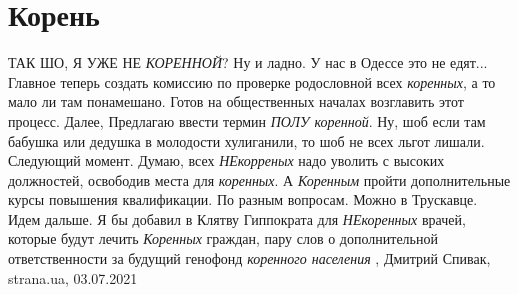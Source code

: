 
 
 
 
 
\chapter{Корень}
\label{sec:slova.korenj}



ТАК ШО, Я УЖЕ НЕ \emph{КОРЕННОЙ}?  Ну и ладно. У нас в Одессе это не едят...
Главное теперь создать комиссию по проверке родословной всех \emph{коренных}, а
то мало ли там понамешано. Готов на общественных началах возглавить этот
процесс.  Далее, Предлагаю ввести термин \emph{ПОЛУ коренной}. Ну, шоб если там
бабушка или дедушка в молодости хулиганили, то шоб не всех льгот лишали.
Следующий момент. Думаю, всех \emph{НЕкорреных} надо уволить с высоких
должностей, освободив места для \emph{коренных}. А \emph{Коренным} пройти
дополнительные курсы повышения квалификации. По разным вопросам. Можно в
Трускавце.  Идем дальше. Я бы добавил в Клятву Гиппократа для \emph{НЕкоренных}
врачей, которые будут лечить \emph{Коренных} граждан, пару слов о
дополнительной ответственности за будущий генофонд \emph{коренного населения}
   , Дмитрий Спивак, strana.ua, 03.07.2021
